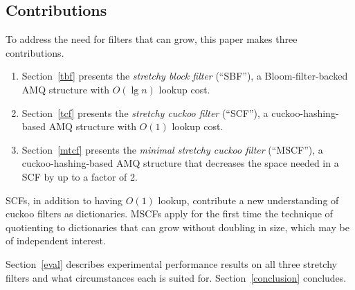 \documentclass[letterpaper,twocolumn,10pt]{article}
\newcommand{\etal}{et al.}
\newcommand{\taffy}{stretchy}
\newcommand{\TBF}{SBF}
\newcommand{\TCF}{SCF}
\newcommand{\MTCF}{MSCF}
\newcommand{\taffy}{taffy}
\newcommand{\TBF}{TBF}
\newcommand{\TCF}{TCF}
\newcommand{\MTCF}{MTCF}
\begin{document}







\subsection{Contributions}

To address the need for filters that can grow, this paper makes three contributions.

\begin{enumerate}
\item Section~\ref{tbf}  presents the {\em \taffy{} block filter}          (``\TBF{}''),  a Bloom-filter-backed  AMQ structure with $O(\lg n)$ lookup cost.
\item Section~\ref{tcf}  presents the {\em \taffy{} cuckoo filter}         (``\TCF{}''),  a cuckoo-hashing-based AMQ structure with $O(1)$ lookup cost.
\item Section~\ref{mtcf} presents the {\em minimal \taffy{} cuckoo filter} (``\MTCF{}''), a cuckoo-hashing-based AMQ structure that decreases the space needed in a \TCF{} by up to a factor of 2.
\end{enumerate}

\TCF{}s, in addition to having $O(1)$ lookup, contribute a new understanding of cuckoo filters as dictionaries.
\MTCF{}s apply for the first time the technique of quotienting to dictionaries that can grow without doubling in size, which may be of independent interest.

Section~\ref{eval} describes experimental performance results on all three \taffy{} filters and what circumstances each is suited for. %
Section~\ref{conclusion} concludes.
\end{document}
